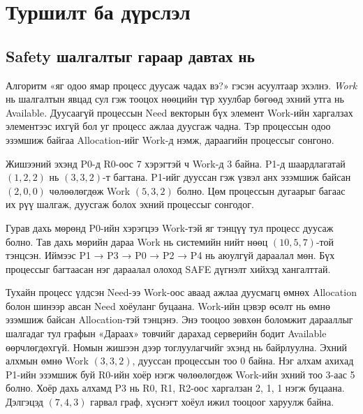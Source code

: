 \section{Туршилт ба дүрслэл}
\subsection{Safety шалгалтыг гараар давтах нь}
Алгоритм «яг одоо ямар процесс дуусаж чадах вэ?» гэсэн асуултаар эхэлнэ. \textit{Work} нь шалгалтын явцад сул гэж тооцох нөөцийн түр хуулбар бөгөөд эхний утга нь Available. Дуусаагүй процессын Need векторын бүх элемент Work-ийн харгалзах элементээс ихгүй бол уг процесс ажлаа дуусгаж чадна. Тэр процессын одоо эзэмшиж байгаа Allocation-ийг Work-д нэмж, дараагийн процессыг сонгоно.

Жишээний эхэнд P0-д R0-оос 7 хэрэгтэй ч Work-д 3 байна. P1-д шаардлагатай $(1,2,2)$ нь $(3,3,2)$-т багтана. P1-ийг дууссан гэж үзвэл анх эзэмшиж байсан $(2,0,0)$ чөлөөлөгдөж Work $(5,3,2)$ болно. Цөм процессын дугаарыг багаас их рүү шалгаж, дуусгаж болох эхний процессыг сонгодог.


Гурав дахь мөрөнд P0-ийн хэрэгцээ Work-тэй яг тэнцүү тул процесс дуусаж болно. Тав дахь мөрийн дараа Work нь системийн нийт нөөц $(10,5,7)$-той тэнцсэн. Иймээс P1 → P3 → P0 → P2 → P4 нь аюулгүй дараалал мөн. Бүх процессыг багтаасан нэг дараалал олоход SAFE дүгнэлт хийхэд хангалттай.

 Тухайн процесс үлдсэн Need-ээ Work-оос аваад ажлаа дуусмагц өмнөх Allocation болон шинээр авсан Need хоёуланг буцаана. Work-ийн цэвэр өсөлт нь өмнө эзэмшиж байсан Allocation-тэй тэнцэнэ. Энэ тооцоо зөвхөн боломжит дарааллыг шалгадаг тул графын «Дараах» товчийг дарахад серверийн бодит Available өөрчлөгдөхгүй.
 Номын жишээн дээр тоглуулагчийг эхэнд нь байрлуулна. Эхний алхмын өмнө Work $(3,3,2)$, дууссан процессын тоо 0 байна. Нэг алхам ахихад P1-ийн эзэмшиж буй R0-ийн хоёр нэгж чөлөөлөгдөж Work-ийн эхний тоо 3-аас 5 болно. Хоёр дахь алхамд P3 нь R0, R1, R2-оос харгалзан 2, 1, 1 нэгж буцаана. Дэлгэцэд $(7,4,3)$ гарвал граф, хүснэгт хоёул ижил тооцоог харуулж байна.
\newpage
